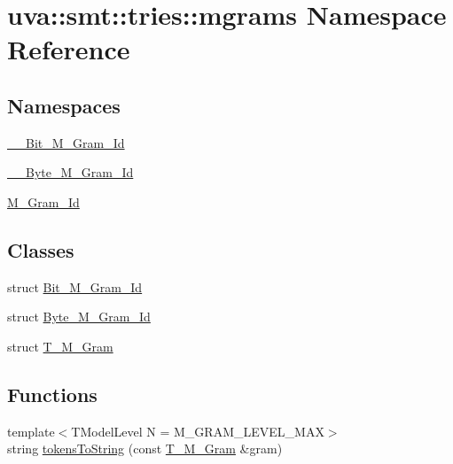 \hypertarget{namespaceuva_1_1smt_1_1tries_1_1mgrams}{}\section{uva\+:\+:smt\+:\+:tries\+:\+:mgrams Namespace Reference}
\label{namespaceuva_1_1smt_1_1tries_1_1mgrams}
\subsection*{Namespaces}
\begin{DoxyCompactItemize}
\item 
 \hyperlink{namespaceuva_1_1smt_1_1tries_1_1mgrams_1_1_____bit___m___gram___id}{\+\_\+\+\_\+\+Bit\+\_\+\+M\+\_\+\+Gram\+\_\+\+Id}
\item 
 \hyperlink{namespaceuva_1_1smt_1_1tries_1_1mgrams_1_1_____byte___m___gram___id}{\+\_\+\+\_\+\+Byte\+\_\+\+M\+\_\+\+Gram\+\_\+\+Id}
\item 
 \hyperlink{namespaceuva_1_1smt_1_1tries_1_1mgrams_1_1_m___gram___id}{M\+\_\+\+Gram\+\_\+\+Id}
\end{DoxyCompactItemize}
\subsection*{Classes}
\begin{DoxyCompactItemize}
\item 
struct \hyperlink{structuva_1_1smt_1_1tries_1_1mgrams_1_1_bit___m___gram___id}{Bit\+\_\+\+M\+\_\+\+Gram\+\_\+\+Id}
\item 
struct \hyperlink{structuva_1_1smt_1_1tries_1_1mgrams_1_1_byte___m___gram___id}{Byte\+\_\+\+M\+\_\+\+Gram\+\_\+\+Id}
\item 
struct \hyperlink{structuva_1_1smt_1_1tries_1_1mgrams_1_1_t___m___gram}{T\+\_\+\+M\+\_\+\+Gram}
\end{DoxyCompactItemize}
\subsection*{Functions}
\begin{DoxyCompactItemize}
\item 
{\footnotesize template$<$T\+Model\+Level N = M\+\_\+\+G\+R\+A\+M\+\_\+\+L\+E\+V\+E\+L\+\_\+\+M\+A\+X$>$ }\\string \hyperlink{namespaceuva_1_1smt_1_1tries_1_1mgrams_a2727ba10ed3a601028fca850a2e2b5bf}{tokens\+To\+String} (const \hyperlink{structuva_1_1smt_1_1tries_1_1mgrams_1_1_t___m___gram}{T\+\_\+\+M\+\_\+\+Gram} \&gram)
\end{DoxyCompactItemize}


